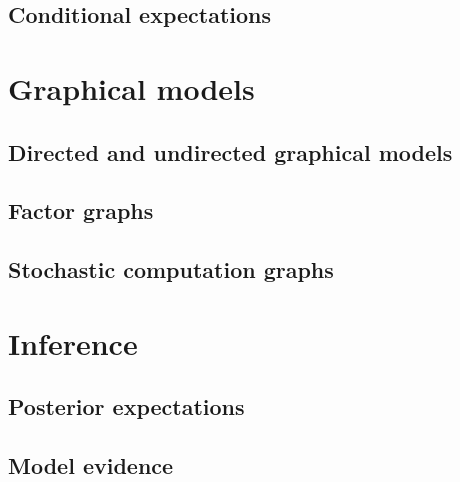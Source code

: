 \subsection{Conditional expectations}

\section{Graphical models}


\subsection{Directed and undirected graphical models}

\subsection{Factor graphs}

\subsection{Stochastic computation graphs}

\section{Inference}


\subsection{Posterior expectations}

\subsection{Model evidence}


